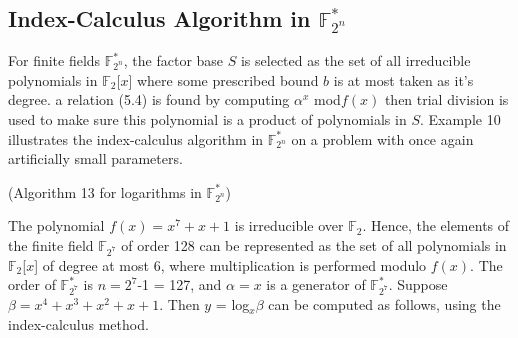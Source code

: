 \documentclass[iwp,first]{luthesis}
\begin{document}
\subsection{Index-Calculus Algorithm in $\mathbb{F}_{2^n}^{*}$}

For finite fields $\mathbb{F}_{2^n}^{*}$, the factor base $S$ is selected as the set of all irreducible polynomials in $\mathbb{F}_{2}$[$x$] where some prescribed bound $b$ is at most taken as it's degree. a relation (5.4) is found by computing $\alpha^x$ mod$f(x)$ then trial division is used to make sure this polynomial is a product of polynomials in $S$. Example 10 illustrates the index-calculus algorithm in $\mathbb{F}_{2^n}^{*}$ on a problem with once again artificially small parameters.

\begin{example}{(Algorithm 13 for logarithms in $\mathbb{F}_{2^n}^{*}$)}
\end{example}

The polynomial $f(x) = x^7 + x + 1$ is irreducible over $\mathbb{F}_2$. Hence, the elements of the finite field $\mathbb{F}_{2^7}$ of order 128 can be represented as the set of all polynomials in $\mathbb{F}_2$[$x$] of degree at most 6, where multiplication is performed modulo $f(x)$. The order of $\mathbb{F}_{2^7}^{*}$ is $n = 2^7$-1 = 127, and $\alpha = x$ is a generator of $\mathbb{F}_{2^7}^{*}$. Suppose $\beta = x^4 + x^3 + x^2 + x + 1$. Then $y$ = log$_{x}\beta$ can be computed as follows, using  the index-calculus method.
\end{document}
